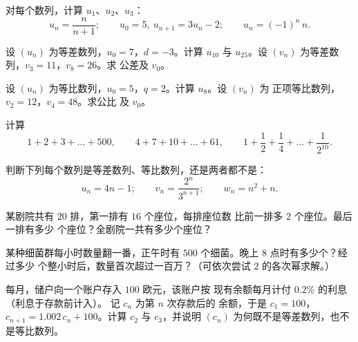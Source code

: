 \begin{exercise}[$\star$]\label{exo:g11:seq:1}
对每个数列，计算 $u_1$、$u_2$、$u_3$：
\[
u_n = \frac{n}{n+1}; \qquad
u_0 = 5,\ u_{n+1} = 3u_n - 2; \qquad
u_n = (-1)^n\,n .
\]
\end{exercise}

\begin{exercise}[$\star$]\label{exo:g11:seq:2}
设 $(u_n)$ 为等差数列，$u_0 = 7$，$d = -3$。计算 $u_{10}$ 与
$u_{25}$。设 $(v_n)$ 为等差数列，$v_3 = 11$，$v_8 = 26$。求
公差及 $v_0$。
\end{exercise}

\begin{exercise}[$\star$]\label{exo:g11:seq:3}
设 $(u_n)$ 为等比数列，$u_0 = 5$，$q = 2$。计算 $u_8$。设 $(v_n)$ 为
正项等比数列，$v_2 = 12$，$v_4 = 48$。求公比
及 $v_0$。
\end{exercise}

\begin{exercise}[$\star$]\label{exo:g11:seq:4}
计算
\[
1 + 2 + 3 + \dots + 500, \qquad
4 + 7 + 10 + \dots + 61, \qquad
1 + \frac12 + \frac14 + \dots + \frac{1}{2^{10}} .
\]
\end{exercise}

\begin{exercise}[$\star$]\label{exo:g11:seq:5}
判断下列每个数列是等差数列、等比数列，还是两者都不是：
\[
u_n = 4n - 1; \qquad
v_n = \frac{2^n}{3^{n+1}}; \qquad
w_n = n^2 + n .
\]
\end{exercise}

\begin{exercise}[$\star\star$]\label{exo:g11:seq:6}
某剧院共有 $20$ 排，第一排有 $16$ 个座位，每排座位数
比前一排多 $2$ 个座位。最后一排有多少
个座位？全剧院一共有多少个座位？
\end{exercise}

\begin{exercise}[$\star\star$]\label{exo:g11:seq:7}
某种细菌群每小时数量翻一番，正午时有 $500$
个细菌。晚上 8 点时有多少个？经过多少
个整小时后，数量首次超过一百万？（可依次尝试
$2$ 的各次幂求解。）
\end{exercise}

\begin{exercise}[$\star\star$]\label{exo:g11:seq:8}
每月，储户向一个账户存入 $100$ 欧元，该账户按
现有余额每月计付 $0.2\%$ 的利息（利息于存款前计入）。
记 $c_n$ 为第 $n$ 次存款后的
余额，于是 $c_1 = 100$，$c_{n+1} = 1.002\,c_n + 100$。计算 $c_2$
与 $c_3$，并说明 $(c_n)$ 为何既不是等差数列，也不是等比数列。
\end{exercise}

